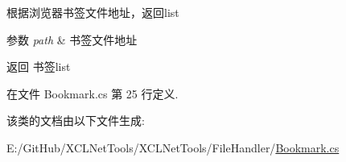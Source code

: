 根据浏览器书签文件地址，返回list 


\begin{DoxyParams}{参数}
{\em path} & 书签文件地址\\
\hline
\end{DoxyParams}
\begin{DoxyReturn}{返回}
书签list
\end{DoxyReturn}


在文件 Bookmark.\+cs 第 25 行定义.



该类的文档由以下文件生成\+:\begin{DoxyCompactItemize}
\item 
E\+:/\+Git\+Hub/\+X\+C\+L\+Net\+Tools/\+X\+C\+L\+Net\+Tools/\+File\+Handler/\hyperlink{_bookmark_8cs}{Bookmark.\+cs}\end{DoxyCompactItemize}
